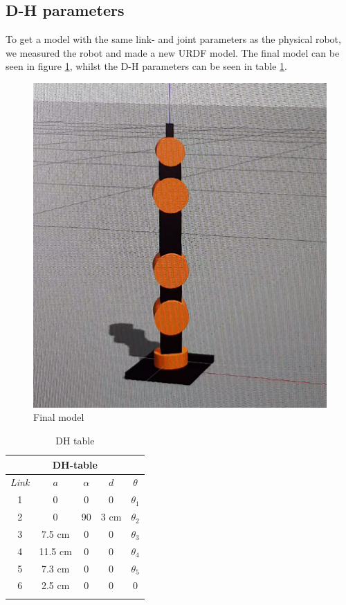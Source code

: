 \documentclass[11pt,a4paper, titlepage]{article}
\begin{document}
	\subsection{D-H parameters}
	To get a model with the same link- and joint parameters as the physical robot, we measured the robot and made a new URDF model. The final model can be seen in figure \ref{fig:urdf-final}, whilst the D-H parameters can be seen in table \ref{DH-table}.
	
	\begin{figure}[H]
		\centering
		\includegraphics[width=0.7\linewidth]{../Diagrams/URDF-final.png}
		\caption{Final model}
		\label{fig:urdf-final}
	\end{figure}
	
	\begin{center}           
    \begin{longtable}{| c | c | c | c | c |}
              \hline
                       
\multicolumn{5}{|c|}{\textbf{DH-table}} \\ \hline \endhead
\textit{Link} & \textbf{$a$} & \textbf{$\alpha$} & $d$ & \textbf{$\theta$} \\ \hline             
               1 & 0 & 0 &  0 & $\theta_1$ \\ \hline
               2 & 0 & 90 & 3 cm & $\theta_2$ \\ \hline
               3 & 7.5 cm & 0 & 0 & $\theta_3$ \\ \hline
               4 & 11.5 cm & 0 & 0 & $\theta_4$ \\ \hline
               5 & 7.3 cm & 0 & 0 & $\theta_5$ \\ \hline
               6 & 2.5 cm & 0 & 0 & 0 \\ \hline
               
\caption{DH table}
\label{DH-table}                                       
\end{longtable}
\end{center}
\end{document}
